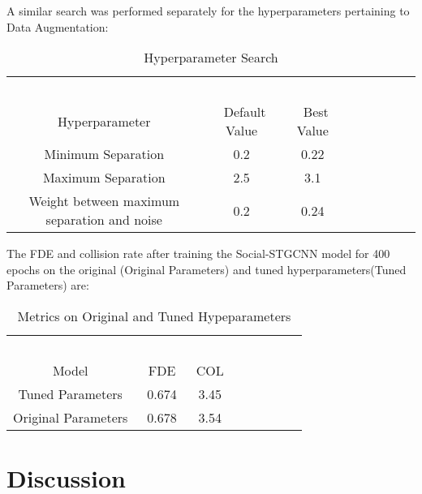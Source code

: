 A similar search was performed separately for the hyperparameters pertaining to Data Augmentation:

\begin{table}[!h]
\caption{Hyperparameter Search} %
\centering %
\begin{tabular}{ccc rrrrr} 
\hline 
&\ \ \ \ \ \\
Hyperparameter&\ Default Value&\ Best Value&\ \\ [0.5ex]
\hline 
Minimum Separation &  0.2 & 0.22\\
Maximum Separation & 2.5 & 3.1\\
Weight between maximum separation and noise &  0.2 & 0.24\\
\hline
\end{tabular}
\label{tab:hresult}
\end{table}

The FDE and collision rate after training the Social-STGCNN model for 400 epochs on the original (Original Parameters) and tuned hyperparameters(Tuned Parameters) are:
\begin{table}[!h]
\caption{Metrics on Original and Tuned Hypeparameters} %
\centering %
\begin{tabular}{ccc rrrrr} 
\hline 
&\ \ \ \ \ \\
Model&\ FDE&\ COL&\ \\ [0.5ex]
\hline 
Tuned Parameters&\ 0.674&\ 3.45&\ \\
Original Parameters&\ 0.678&\ 3.54&\ \\

\hline
\end{tabular}
\label{tab:hresult}
\end{table}

\section{Discussion}

